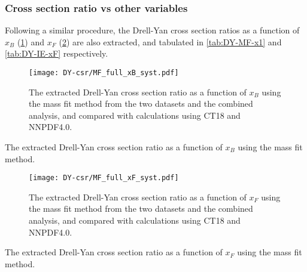 \documentclass[../main.tex]{subfiles}
\begin{document}
\subsubsection{Cross section ratio vs other variables}
Following a similar procedure, the Drell-Yan cross section ratios as a function of $x_B$ (\cref{fig:CSR_MF_xB})
and $x_F$ (\cref{fig:CSR_MF_xF}) are also extracted, and tabulated in \cref{tab:DY-MF-x1} and \cref{tab:DY-IE-xF} respectively.
\begin{figure}[h!]
	\centering
	\texttt{[image: DY-csr/MF\_full\_xB\_syst.pdf]}
	\caption{The extracted Drell-Yan cross section ratio as a function of $x_B$
		using the mass fit method from the two datasets and the combined analysis,
		and compared with calculations using CT18 and NNPDF4.0.}
	\label{fig:CSR_MF_xB}
\end{figure}
\begin{table}[h!]
	\centering
	\caption{The extracted Drell-Yan cross section ratio as a function of $x_B$ using the mass fit method.}
	\label{tab:DY-MF-x1}
	
\end{table}
\begin{figure}[h!]
	\centering
	\texttt{[image: DY-csr/MF\_full\_xF\_syst.pdf]}
	\caption{The extracted Drell-Yan cross section ratio as a function of $x_F$
		using the mass fit method from the two datasets and the combined analysis,
		and compared with calculations using CT18 and NNPDF4.0.}
	\label{fig:CSR_MF_xF}
\end{figure}
\begin{table}[h!]
	\centering
	\caption{The extracted Drell-Yan cross section ratio as a function of $x_F$ using the mass fit method.}
	\label{tab:DY-MF-xF}
	
\end{table}
\FloatBarrier
\end{document}
